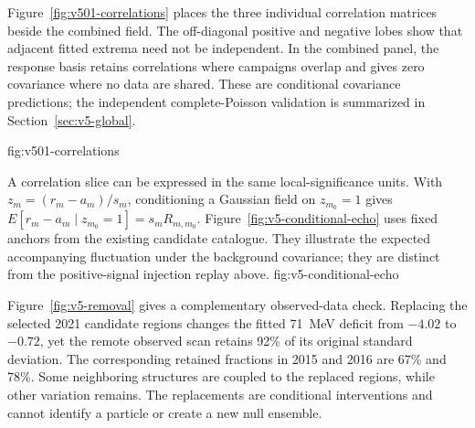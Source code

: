 Figure~\ref{fig:v501-correlations} places the three individual correlation
matrices beside the combined field. The off-diagonal positive and negative
lobes show that adjacent fitted extrema need not be independent. In the
combined panel, the response basis retains correlations where campaigns
overlap and gives zero covariance where no data are shared. These are
conditional covariance predictions; the independent complete-Poisson
validation is summarized in Section~\ref{sec:v5-global}.

{fig:v501-correlations}

A correlation slice can be expressed in the same local-significance units.
With $z_m=(r_m-a_m)/s_m$, conditioning a Gaussian field on $z_{m_0}=1$ gives
$E[r_m-a_m\mid z_{m_0}=1]=s_m R_{m,m_0}$. Figure~\ref{fig:v5-conditional-echo} uses fixed
anchors from the existing candidate catalogue. They illustrate the expected
accompanying fluctuation under the background covariance; they are distinct
from the positive-signal injection replay above.
{fig:v5-conditional-echo}

Figure~\ref{fig:v5-removal} gives a complementary observed-data check. Replacing
the selected 2021 candidate regions changes the fitted 71~MeV deficit from
$-4.02$ to $-0.72$, yet the remote observed scan retains 92\% of its original
standard deviation. The corresponding retained fractions in 2015 and 2016
are 67\% and 78\%. Some neighboring structures are coupled to the replaced
regions, while other variation remains. The replacements are conditional
interventions and cannot identify a particle or create a new null ensemble.

